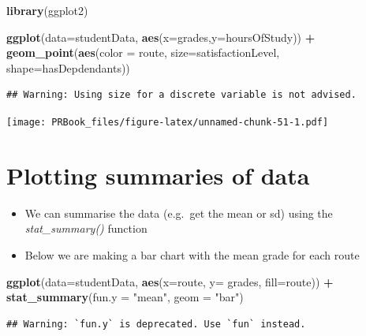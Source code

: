 \documentclass[
]{book}
\newenvironment{Shaded}{\begin{snugshade}}{\end{snugshade}}
\newcommand{\DataTypeTok}[1]{\textcolor[rgb]{0.13,0.29,0.53}{#1}}
\newcommand{\KeywordTok}[1]{\textcolor[rgb]{0.13,0.29,0.53}{\textbf{#1}}}
\newcommand{\NormalTok}[1]{#1}
\newcommand{\OperatorTok}[1]{\textcolor[rgb]{0.81,0.36,0.00}{\textbf{#1}}}
\newcommand{\StringTok}[1]{\textcolor[rgb]{0.31,0.60,0.02}{#1}}
\providecommand{\tightlist}{%
  \setlength{\itemsep}{0pt}\setlength{\parskip}{0pt}}
\begin{document}
\begin{Shaded}
\begin{Highlighting}[]
\KeywordTok{library}\NormalTok{(ggplot2)}

\KeywordTok{ggplot}\NormalTok{(}\DataTypeTok{data=}\NormalTok{studentData, }\KeywordTok{aes}\NormalTok{(}\DataTypeTok{x=}\NormalTok{grades,}\DataTypeTok{y=}\NormalTok{hoursOfStudy)) }\OperatorTok{+}\StringTok{ }\KeywordTok{geom_point}\NormalTok{(}\KeywordTok{aes}\NormalTok{(}\DataTypeTok{color =}\NormalTok{ route, }\DataTypeTok{size=}\NormalTok{satisfactionLevel, }\DataTypeTok{shape=}\NormalTok{hasDepdendants))}
\end{Highlighting}
\end{Shaded}

\begin{verbatim}
## Warning: Using size for a discrete variable is not advised.
\end{verbatim}

\texttt{[image: PRBook\_files/figure-latex/unnamed-chunk-51-1.pdf]}

\hypertarget{plotting-summaries-of-data}{%
\section{Plotting summaries of data}\label{plotting-summaries-of-data}}

\begin{itemize}
\tightlist
\item
  We can summarise the data (e.g.~get the mean or sd) using the \emph{stat\_summary()} function
\item
  Below we are making a bar chart with the mean grade for each route
\end{itemize}

\begin{Shaded}
\begin{Highlighting}[]
\KeywordTok{ggplot}\NormalTok{(}\DataTypeTok{data=}\NormalTok{studentData, }\KeywordTok{aes}\NormalTok{(}\DataTypeTok{x=}\NormalTok{route, }\DataTypeTok{y=}\NormalTok{ grades, }\DataTypeTok{fill=}\NormalTok{route)) }\OperatorTok{+}\StringTok{ }\KeywordTok{stat_summary}\NormalTok{(}\DataTypeTok{fun.y =} \StringTok{"mean"}\NormalTok{, }\DataTypeTok{geom =} \StringTok{"bar"}\NormalTok{)}
\end{Highlighting}
\end{Shaded}

\begin{verbatim}
## Warning: `fun.y` is deprecated. Use `fun` instead.
\end{verbatim}
\end{document}
